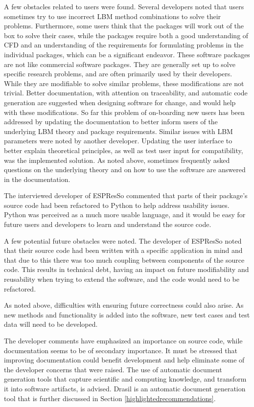 \documentclass[12pt, notitlepage]{article}
\begin{document}
A few obstacles related to users were found. Several developers noted that users sometimes try to use incorrect LBM method combinations to solve their problems. Furthermore, some users think that the packages will work out of the box to solve their cases, while the packages require both a good understanding of CFD and an understanding of the requirements for formulating problems in the individual packages, which can be a significant endeavor. These software packages are not like commercial software packages. They are generally set up to solve specific research problems, and are often primarily used by their developers. While they are modifiable to solve similar problems, these modifications are not trivial. Better documentation, with attention on traceability, and automatic code generation are suggested when designing software for change, and would help with these modifications. So far this problem of on-boarding new users has been addressed by updating the documentation to better inform users of the underlying LBM theory and package requirements. Similar issues with LBM parameters were noted by another developer. Updating the user interface to better explain theoretical principles, as well as test user input for compatibility, was the implemented solution. As noted above, sometimes frequently asked questions on the underlying theory and on how to use the software are answered in the documentation.

The interviewed developer of ESPResSo commented that parts of their package's source code had been refactored to Python to help address usability issues. Python was perceived as a much more usable language, and it would be easy for future users and developers to learn and understand the source code. 

A few potential future obstacles were noted. The developer of ESPResSo noted that their source code had been written with a specific application in mind and that due to this there was too much coupling between components of the source code. This results in technical debt, having an impact on future modifiability and reusability when trying to extend the software, and the code would need to be refactored.

As noted above, difficulties with ensuring future correctness could also arise. As new methods and functionality is added into the software, new test cases and test data will need to be developed.

The developer comments have emphasized an importance on source code, while documentation seems to be of secondary importance. It must be stressed that improving documentation could benefit development and help eliminate some of the developer concerns that were raised. The use of automatic document generation tools that capture scientific and computing knowledge, and transform it into software artifacts, is advised. Drasil is an automatic document generation tool that is further discussed in Section \ref{highlightedrecommendations}.
\end{document}
